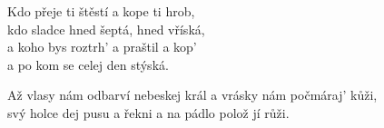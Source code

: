 \vspace*{-3pt}
 
\re{*:}
Kdo přeje ti štěstí a kope ti hrob,\\
kdo sladce hned šeptá, hned vříská,\\
a koho bys roztrh' a praštil a kop'\\
a po kom se celej den stýská. 

\vspace*{-3pt}

\ve{}
Až vlasy nám odbarví nebeskej král a vrásky nám počmáraj' kůži,\\
svý holce dej pusu a řekni  a na pádlo polož jí růži.

\vspace*{-3pt}

\cho{}

\vspace*{-5pt}

\esong